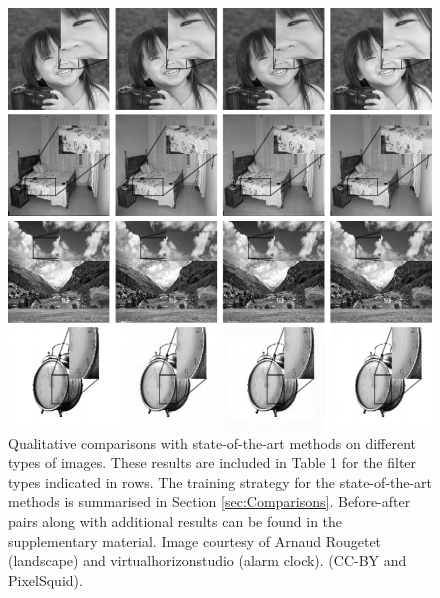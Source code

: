 \begin{figure}%
  \centering
  \includegraphics[width=.9\linewidth]{Chapters/detail-retouching-figs/Qualitative_zoomed_LLF_a05_s01.pdf}
    \caption{Qualitative comparisons with state-of-the-art methods on different types of images. These results are included in Table 1 for the filter types indicated in rows. The training strategy for the state-of-the-art methods is summarised in Section \ref{sec:Comparisons}. Before-after pairs along with additional results can be found in the supplementary material. Image courtesy of Arnaud Rougetet (landscape) and virtualhorizonstudio (alarm clock). (CC-BY and PixelSquid).} 

   \label{fig:QualitativeComp}%
\end{figure}



